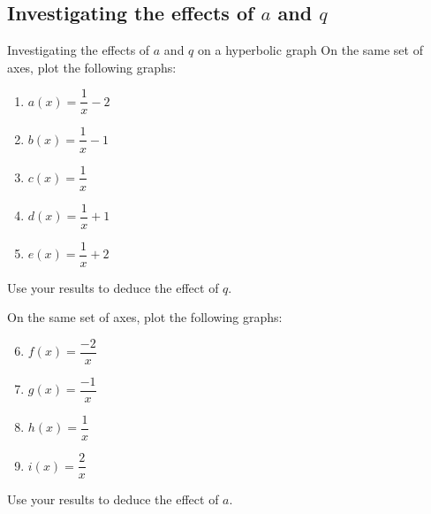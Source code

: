 % 

\subsection*{ Investigating the effects of $a$ and $q$ }
\begin{Investigation}{Investigating the effects of $a$ and $q$ on a hyperbolic graph}
 On the same set of axes, plot the following graphs:
    \begin{enumerate}[itemsep=3pt, label=\textbf{\arabic*}. ] 
    \item $a(x)=\dfrac{1}{x}-2$
    \item $b(x)=\dfrac{1}{x}-1$
    \item $c(x)=\dfrac{1}{x}$
    \item $d(x)=\dfrac{1}{x}+1$
    \item $e(x)=\dfrac{1}{x}+2$
\end{enumerate}
Use your results to deduce the effect of $q$.\par

On the same set of axes, plot the following graphs:
    \begin{enumerate}[itemsep=3pt, label=\textbf{\arabic*}. ] 
\setcounter{enumi}{5}
    \item $f(x)=\dfrac{-2}{x}$
    \item $g(x)=\dfrac{-1}{x}$
    \item $h(x)=\dfrac{1}{x}$
    \item $i(x)=\dfrac{2}{x}$
    \end{enumerate}
Use your results to deduce the effect of $a$.
\end{Investigation}

